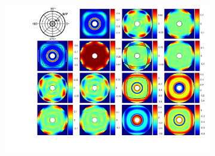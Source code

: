 \begin{figure}[h]  %
\begin{subfigure}{\textwidth}
    \centering
    \includegraphics[width=\linewidth, trim=3cm 1.5cm 0.5cm 0cm, clip]{figures/ch4/S6/contour/Mueller_rot_S6_COMSOLSIM_55(2)(1).pdf}
    
\end{subfigure}


\end{figure}
